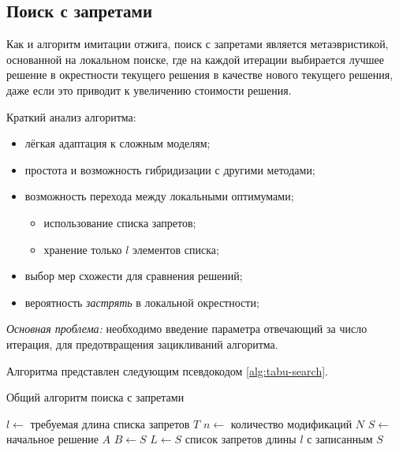 \subsection{Поиск с запретами}
Как и алгоритм имитации отжига, поиск с запретами является метаэвристикой, основанной на локальном поиске, 
где на каждой итерации выбирается лучшее решение в окрестности текущего решения в качестве нового текущего 
решения, даже если это приводит к увеличению стоимости решения.

Краткий анализ алгоритма:
\begin{itemize}
    \item лёгкая адаптация к сложным моделям;
    \item простота и возможность гибридизации с другими методами;
    \item возможность перехода между локальными оптимумами;
    \begin{itemize}
        \item использование списка запретов;
        \item хранение только \( l \) элементов списка;
    \end{itemize}
    \item выбор мер схожести для сравнения решений;
    \item вероятность \emph{застрять} в локальной окрестности;
\end{itemize}

\emph{Основная проблема:} необходимо введение параметра отвечающий за число итерация, для предотвращения 
зацикливаний алгоритма.

Алгоритма представлен следующим псевдокодом \ref{alg:tabu-search}.

\clearpage

\begin{algorithm}[ht!]
    \caption{Общий алгоритм поиска с запретами}
    \( l \leftarrow \) требуемая длина списка запретов \( T \)\;
    \( n \leftarrow \) количество модификаций \( N \)\;
    \( S \leftarrow \) начальное решение \( A \)\;
    \( B \leftarrow S \)\;
    \( L \leftarrow { S } \) список запретов длины \( l \) с записанным \( S \)\;
    \label{alg:tabu-search}
\end{algorithm}

